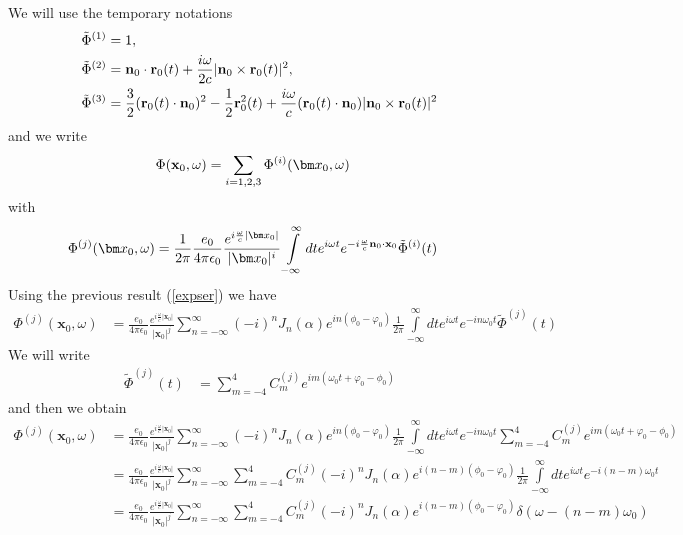 We will use the temporary notations
\begin{align}
     & \tilde\Phi^{(1)} = 1,                                                                                \\
     & \tilde\Phi^{(2)}  = {\bf n}_0\cdot{\bf r}_0(t)+\frac{i\omega}{2c}{|{\bf n}_0\times{\bf r}_0(t)|^2} , \\
     & \tilde\Phi^{(3)} = \frac32({\bf r}_0(t)
    \cdot{\bf n}_0)^2-\frac12{\bf r}^2_0(t)+\frac{i\omega}c({\bf r}_0(t)
    \cdot{\bf n}_0) |{\bf n}_0\times{\bf r}_0(t)|^2
\end{align}
and we write
\begin{align}
    \Phi({\bf x}_0,\omega) & = \sum\limits_{i=1,2,3}\Phi^{(i)}({\bm x}_0,\omega)
\end{align}
with
\begin{align}
    \Phi^{(j)}({\bm x}_0,\omega) & = \frac1{2\pi}\frac{e_0}{4\pi\epsilon_0}\frac{ e^{i\frac{\omega}c|{\bm x}_0|}}{|{\bm x}_0|^i}\int\limits_{-\infty}^{\infty}dte^{i\omega t} e^{-i\frac{\omega}c{\bf n}_0\cdot{\bf x}_0}\tilde\Phi^{(i)}(t)
\end{align}
Using the previous result (\ref{expser}) we have
\begin{align}
    \Phi^{(j)}({\bm x}_0,\omega) & =\frac{e_0}{4\pi\epsilon_0}\frac{ e^{i\frac{\omega}c|{\bm x}_0|}}{|{\bm x}_0|^j}\sum\limits_{n=-\infty}^{\infty}(-i)^nJ_n(\alpha) e^{in(\phi_0-\varphi_0)}\frac1{2\pi}\int\limits_{-\infty}^{\infty}dt e^{i\omega t}e^{-i n \omega_0 t}\tilde\Phi^{(j)}(t)
\end{align}
We will write
\begin{align}
    \tilde\Phi^{(j)}(t) & = \sum\limits_{m=-4}^{4} C^{(j)}_m e^{im (\omega_0t + \varphi_0-\phi_0)}
\end{align}
and then we obtain
\begin{align}
    \Phi^{(j)}({\bm x}_0,\omega) & =\frac{e_0}{4\pi\epsilon_0}\frac{ e^{i\frac{\omega}c|{\bm x}_0|}}{|{\bm x}_0|^j}\sum\limits_{n=-\infty}^{\infty}(-i)^nJ_n(\alpha) e^{in(\phi_0-\varphi_0)}\frac1{2\pi}\int\limits_{-\infty}^{\infty}dt e^{i\omega t} e^{-i n \omega_0 t}\sum\limits_{m=-4}^{4} C^{(j)}_m e^{im (\omega_0t + \varphi_0-\phi_0)}\nonumber \\
                                 & =\frac{e_0}{4\pi\epsilon_0}\frac{ e^{i\frac{\omega}c|{\bm x}_0|}}{|{\bm x}_0|^j}\sum\limits_{n=-\infty}^{\infty}\sum\limits_{m=-4}^{4} C^{(j)}_m (-i)^nJ_n(\alpha) e^{i(n-m)(\phi_0-\varphi_0)}\frac1{2\pi}\int\limits_{-\infty}^{\infty}dte^{i\omega t} e^{-i (n-m) \omega_0 t}\nonumber                               \\
                                 & =\frac{e_0}{4\pi\epsilon_0}\frac{ e^{i\frac{\omega}c|{\bm x}_0|}}{|{\bm x}_0|^j}\sum\limits_{n=-\infty}^{\infty}\sum\limits_{m=-4}^{4} C^{(j)}_m (-i)^nJ_n(\alpha) e^{i(n-m)(\phi_0-\varphi_0)}\delta(\omega-(n-m)\omega_0)
\end{align}
